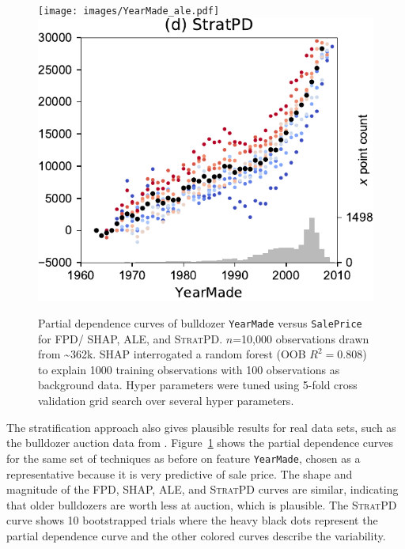\documentclass[]{article} %
\newcommand{\figref}[1]{Figure~\ref{#1}}
\newcommand{\spd}{\fontfamily{cmr}\textsc{\small StratPD}}
\begin{document}
\begin{figure}[!htbp]
\begin{center}
\texttt{[image: images/YearMade\_ale.pdf]}~~
\includegraphics[scale=0.29]{images/bulldozer_YearMade_stratpd.pdf}\vspace{-2mm}
\caption{\small Partial dependence curves of bulldozer {\tt YearMade} versus {\tt SalePrice} for FPD/ SHAP, ALE, and \spd. $n$=10,000 observations drawn from \textasciitilde{}362k. SHAP interrogated a random forest (OOB $R^2=0.808$) to explain 1000 training observations with 100 observations as background data. Hyper parameters were tuned using 5-fold cross validation grid search over several hyper parameters.}
\label{fig:yearmade}
\end{center}
\end{figure}


The stratification approach also gives plausible results for real data sets, such as the bulldozer auction data from \citet{bulldozer}. \figref{fig:yearmade} shows the partial dependence curves for the same set of techniques as before on feature {\tt\small YearMade}, chosen as a representative because it is very predictive of sale price. The shape and magnitude of the FPD, SHAP, ALE, and \spd{} curves are similar, indicating that older bulldozers are worth less at auction, which is plausible. The \spd{} curve shows 10 bootstrapped trials where the heavy black dots represent the partial dependence curve and the other colored curves describe the variability. 
\end{document}
